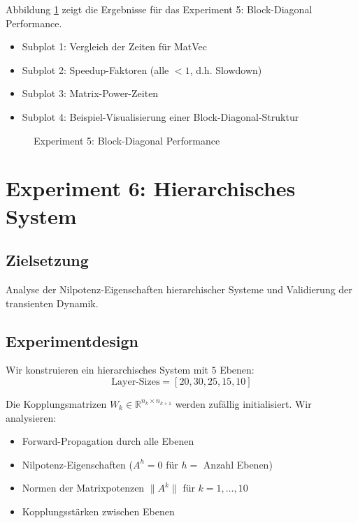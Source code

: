 \documentclass[a4paper,12pt]{report}
\theoremstyle{definition}
\begin{document}
	Abbildung \ref{fig:exp5} zeigt die Ergebnisse für das Experiment 5: Block-Diagonal Performance.
	\begin{itemize}
		\item Subplot 1: Vergleich der Zeiten für MatVec
		\item Subplot 2: Speedup-Faktoren (alle $< 1$, d.h. Slowdown)
		\item Subplot 3: Matrix-Power-Zeiten
		\item Subplot 4: Beispiel-Visualisierung einer Block-Diagonal-Struktur
	\end{itemize}
	
	\begin{figure}[H]
		\centering
		\caption{Experiment 5: Block-Diagonal Performance}
		\label{fig:exp5}
	\end{figure}
	
	\section{Experiment 6: Hierarchisches System}
	
	\subsection{Zielsetzung}
	
	Analyse der Nilpotenz-Eigenschaften hierarchischer Systeme und Validierung der transienten Dynamik.
	
	\subsection{Experimentdesign}
	
	Wir konstruieren ein hierarchisches System mit $5$ Ebenen:
	\[
	\text{Layer-Sizes} = [20, 30, 25, 15, 10]
	\]
	
	Die Kopplungsmatrizen $W_k \in \mathbb{R}^{n_k \times n_{k+1}}$ werden zufällig initialisiert. Wir analysieren:
	
	\begin{itemize}
		\item Forward-Propagation durch alle Ebenen
		\item Nilpotenz-Eigenschaften ($A^h = 0$ für $h = $ Anzahl Ebenen)
		\item Normen der Matrixpotenzen $\|A^k\|$ für $k = 1, \ldots, 10$
		\item Kopplungsstärken zwischen Ebenen
	\end{itemize}
	
\end{document}
